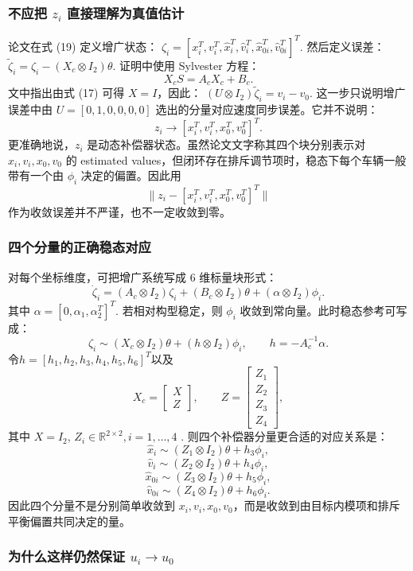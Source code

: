 \subsubsection{不应把 $z_i$ 直接理解为真值估计}

论文在式 (19) 定义增广状态：
\(
\zeta_i=
[x_i^T,v_i^T,\hat x_i^T,\hat v_i^T,\hat x_{0i}^T,\hat v_{0i}^T]^T.
\)
然后定义误差：
\(
\tilde\zeta_i
=
\zeta_i-(X_c\otimes I_2)\theta.
\)
证明中使用 Sylvester 方程：
\[
X_cS=A_cX_c+B_c.
\]
文中指出由式 (17) 可得 $X=I$，因此：
\(
(U\otimes I_2)\tilde\zeta_i
=v_i-v_0.
\)
这一步只说明增广误差中由 $U=[0,1,0,0,0,0]$ 选出的分量对应速度同步误差。它并不说明：
\[
z_i \to [x_i^T,v_i^T,x_0^T,v_0^T]^T.
\]
更准确地说，$z_i$ 是动态补偿器状态。虽然论文文字称其四个块分别表示对 $x_i, v_i, x_0, v_0$ 的 estimated values，但闭环存在排斥调节项时，稳态下每个车辆一般带有一个由 $\phi_i$ 决定的偏置。因此用
\[
\|z_i-[x_i^T,v_i^T,x_0^T,v_0^T]^T\|
\]
作为收敛误差并不严谨，也不一定收敛到零。

\subsubsection{四个分量的正确稳态对应}

对每个坐标维度，可把增广系统写成 6 维标量块形式：
\[
\dot\zeta_i
=
(A_c\otimes I_2)\zeta_i
+(B_c\otimes I_2)\theta
+(\alpha\otimes I_2)\phi_i.
\]
其中
\(
\alpha=[0,\alpha_1,\alpha_2^T]^T.
\)
若相对构型稳定，则 $\phi_i$ 收敛到常向量。此时稳态参考可写成：
\[
\zeta_i
\sim
(X_c\otimes I_2)\theta
+(h\otimes I_2)\phi_i,
\qquad
h=-A_c^{-1}\alpha.
\]
令\(h=[h_1,h_2,h_3,h_4,h_5,h_6]^T\)以及
\[
X_c=
\begin{bmatrix}
X\\Z
\end{bmatrix},
\qquad
Z=
\begin{bmatrix}
Z_1\\Z_2\\Z_3\\Z_4
\end{bmatrix},
\]
其中 \(X=I_2\), \(Z_i\in\mathbb{R}^{2\times 2}, i=1,\dots,4\) .
则四个补偿器分量更合适的对应关系是：
\[
\hat x_i
\sim
(Z_1\otimes I_2)\theta+h_3\phi_i,
\]
\[
\hat v_i
\sim
(Z_2\otimes I_2)\theta+h_4\phi_i,
\]
\[
\hat x_{0i}
\sim
(Z_3\otimes I_2)\theta+h_5\phi_i,
\]
\[
\hat v_{0i}
\sim
(Z_4\otimes I_2)\theta+h_6\phi_i.
\]
因此四个分量不是分别简单收敛到 $x_i, v_i, x_0, v_0$，而是收敛到由目标内模项和排斥平衡偏置共同决定的量。

\subsubsection{为什么这样仍然保证 $u_i \to u_0$}

